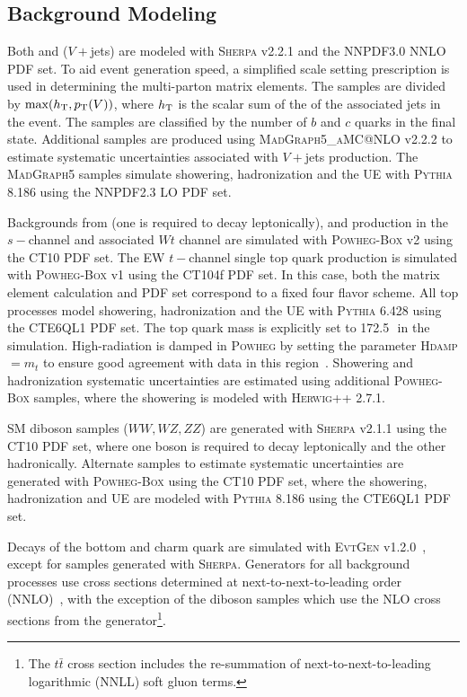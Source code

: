 \subsection{Background Modeling}
Both \Wjets and \Zjets ($V+$jets) are modeled with \textsc{Sherpa} v2.2.1 and the \textsc{NNPDF3.0} NNLO PDF set. To aid event generation speed, a simplified scale setting prescription is used in determining the multi-parton matrix elements. The samples are divided by $\textrm{max}(h_{\rm T},p_{\text{T}}(V))$, where $h_{\rm T}$ is the scalar sum of the \pt of the associated jets in the event. The samples are classified by the number of $b$ and $c$ quarks in the final state. Additional samples are produced using \textsc{MadGraph5\_aMC@NLO} v2.2.2 to estimate systematic uncertainties associated with $V+$jets production. The \textsc{MadGraph5} samples simulate showering, hadronization and the UE with \textsc{Pythia} 8.186 using the \textsc{NNPDF2.3} LO PDF set.

Backgrounds from \ttbar (one is required to decay leptonically), and \Singlet production in the $s-$channel and associated $Wt$ channel are simulated with \textsc{Powheg-Box} v2 using the \textsc{CT10} PDF set. The EW $t-$channel single top quark production is simulated with \textsc{Powheg-Box} v1 using the  \textsc{CT10}4f PDF set. In this case, both the matrix element calculation and PDF set correspond to a fixed four flavor scheme. All top processes model showering, hadronization and the UE with \textsc{Pythia} 6.428 using the \textsc{CTE6QL1} PDF set. The top quark mass is explicitly set to 172.5\,\GeV\, in the simulation. High-\pt radiation is damped in \textsc{Powheg} by setting the parameter \textsc{Hdamp}$=m_t$ to ensure good agreement with data in this region~\cite{hdamp}. Showering and hadronization systematic uncertainties are estimated using additional \textsc{Powheg-Box} samples, where the showering is modeled with \textsc{Herwig++} 2.7.1.

SM diboson samples ($WW, WZ, ZZ$) are generated with \textsc{Sherpa} v2.1.1 using the \textsc{CT10} PDF set, where one boson is required to decay leptonically and the other hadronically. Alternate samples to estimate systematic uncertainties are generated with \textsc{Powheg-Box} using the \textsc{CT10} PDF set, where the showering, hadronization and UE are modeled with \textsc{Pythia} 8.186 using the \textsc{CTE6QL1} PDF set.

Decays of the bottom and charm quark are simulated with \textsc{EvtGen} v1.2.0~\cite{evtgen}, except for samples generated with \textsc{Sherpa}.
Generators for all background processes use cross sections determined at next-to-next-to-leading order (NNLO)~\cite{single_diboson, rapidity_nnlo, ttbar_nnlo, top_pp_nnlo, singletop_nnll, singletop_twoloop}, with the exception of the diboson samples which use the NLO cross sections from the generator\footnote{
The $t\bar{t}$ cross section includes the re-summation of next-to-next-to-leading logarithmic (NNLL) soft gluon terms.
}. 

